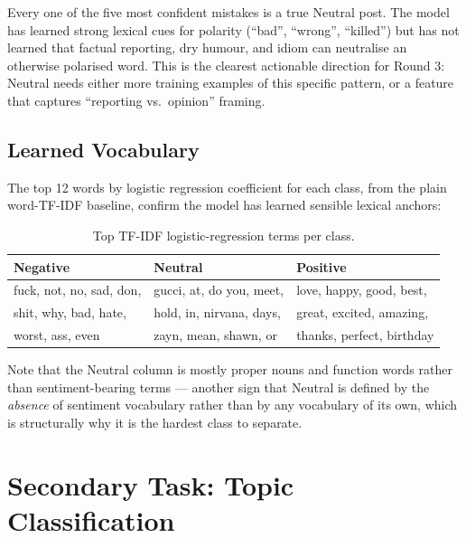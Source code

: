\documentclass[11pt,a4paper]{article}
\begin{document}
\begin{insightbox}
Every one of the five most confident mistakes is a true Neutral post. The model has learned strong lexical cues for polarity (``bad'', ``wrong'', ``killed'') but has not learned that factual reporting, dry humour, and idiom can neutralise an otherwise polarised word. This is the clearest actionable direction for Round 3: Neutral needs either more training examples of this specific pattern, or a feature that captures ``reporting vs.\ opinion'' framing.
\end{insightbox}

\subsection{Learned Vocabulary}

The top 12 words by logistic regression coefficient for each class, from the plain word-TF-IDF baseline, confirm the model has learned sensible lexical anchors:

\begin{table}[H]
\centering
\small
\begin{tabular}{@{}lll@{}}
\toprule
\textbf{Negative} & \textbf{Neutral} & \textbf{Positive} \\
\midrule
fuck, not, no, sad, don, & gucci, at, do you, meet, & love, happy, good, best, \\
shit, why, bad, hate, & hold, in, nirvana, days, & great, excited, amazing, \\
worst, ass, even & zayn, mean, shawn, or & thanks, perfect, birthday \\
\bottomrule
\end{tabular}
\caption{Top TF-IDF logistic-regression terms per class.}
\end{table}

Note that the Neutral column is mostly proper nouns and function words rather than sentiment-bearing terms --- another sign that Neutral is defined by the \emph{absence} of sentiment vocabulary rather than by any vocabulary of its own, which is structurally why it is the hardest class to separate.

\section{Secondary Task: Topic Classification}
\label{sec:topic}
\end{document}
